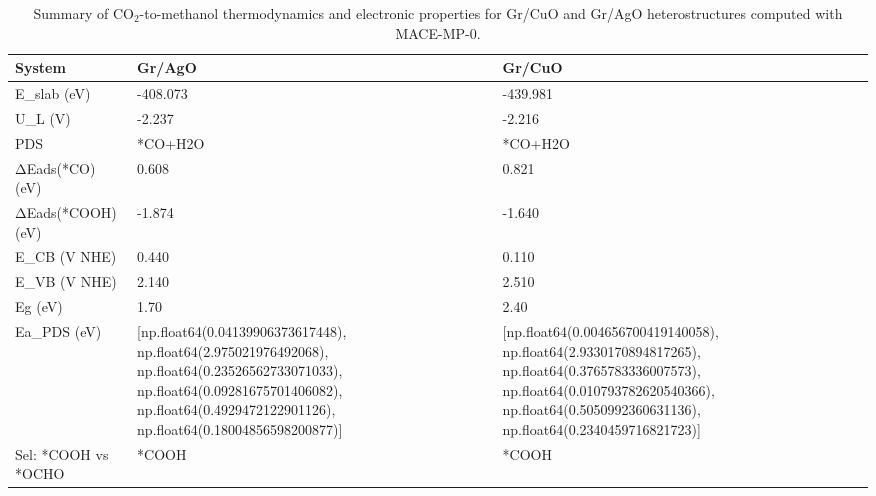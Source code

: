 \begin{table}
\caption{Summary of CO$_2$-to-methanol thermodynamics and electronic properties for Gr/CuO and Gr/AgO heterostructures computed with MACE-MP-0.}
\label{tab:mace_summary}
\begin{tabular}{lll}
\toprule
System & Gr/AgO & Gr/CuO \\
\midrule
E_slab (eV) & -408.073 & -439.981 \\
U_L (V) & -2.237 & -2.216 \\
PDS & *CO+H2O & *CO+H2O \\
ΔEads(*CO) (eV) & 0.608 & 0.821 \\
ΔEads(*COOH) (eV) & -1.874 & -1.640 \\
E_CB (V NHE) & 0.440 & 0.110 \\
E_VB (V NHE) & 2.140 & 2.510 \\
Eg (eV) & 1.70 & 2.40 \\
Ea_PDS (eV) & [np.float64(0.04139906373617448), np.float64(2.975021976492068), np.float64(0.23526562733071033), np.float64(0.09281675701406082), np.float64(0.4929472122901126), np.float64(0.18004856598200877)] & [np.float64(0.004656700419140058), np.float64(2.9330170894817265), np.float64(0.3765783336007573), np.float64(0.010793782620540366), np.float64(0.5050992360631136), np.float64(0.2340459716821723)] \\
Sel: *COOH vs *OCHO & *COOH & *COOH \\
\bottomrule
\end{tabular}
\end{table}
